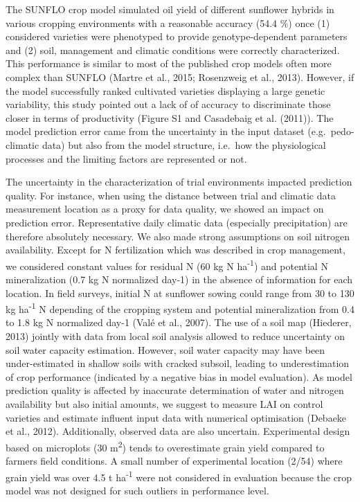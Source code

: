 \documentclass[a4paper]{article}
\begin{document}
The SUNFLO crop model simulated oil yield of different sunflower hybrids
in various cropping environments with a reasonable accuracy (54.4 \%)
once (1) considered varieties were phenotyped to provide
genotype-dependent parameters and (2) soil, management and climatic
conditions were correctly characterized. This performance is similar to
most of the published crop models often more complex than SUNFLO (Martre
et al., 2015; Rosenzweig et al., 2013). However, if the model
successfully ranked cultivated varieties displaying a large genetic
variability, this study pointed out a lack of of accuracy to
discriminate those closer in terms of productivity (Figure S1 and
Casadebaig et al. (2011)). The model prediction error came from the
uncertainty in the input dataset (e.g.~pedo-climatic data) but also from
the model structure, i.e.~how the physiological processes and the
limiting factors are represented or not.

The uncertainty in the characterization of trial environments impacted
prediction quality. For instance, when using the distance between trial
and climatic data measurement location as a proxy for data quality, we
showed an impact on prediction error. Representative daily climatic data
(especially precipitation) are therefore absolutely necessary. We also
made strong assumptions on soil nitrogen availability. Except for N
fertilization which was described in crop management, we considered
constant values for residual N (60 kg N ha\textsuperscript{-1}) and
potential N mineralization (0.7 kg N normalized day-1) in the absence of
information for each location. In field surveys, initial N at sunflower
sowing could range from 30 to 130 kg ha\textsuperscript{-1} N depending
of the cropping system and potential mineralization from 0.4 to 1.8 kg N
normalized day-1 (Valé et al., 2007). The use of a soil map (Hiederer,
2013) jointly with data from local soil analysis allowed to reduce
uncertainty on soil water capacity estimation. However, soil water
capacity may have been under-estimated in shallow soils with cracked
subsoil, leading to underestimation of crop performance (indicated by a
negative bias in model evaluation). As model prediction quality is
affected by inaccurate determination of water and nitrogen availability
but also initial amounts, we suggest to measure LAI on control varieties
and estimate influent input data with numerical optimisation (Debaeke et
al., 2012). Additionally, observed data are also uncertain. Experimental
design based on microplots (30 m\textsuperscript{2}) tends to
overestimate grain yield compared to farmers field conditions. A small
number of experimental location (2/54) where grain yield was over 4.5 t
ha\textsuperscript{-1} were not considered in evaluation because the
crop model was not designed for such outliers in performance level.
\end{document}
